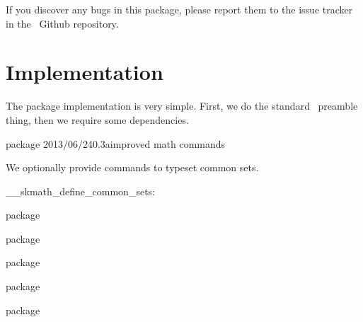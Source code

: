\documentclass[commonsets,load]{skdoc}
\begin{document}
  If you discover any bugs in this package, please report them to the issue
  tracker in the \thepackage\ Github repository.

  \Implementation\ExplHack
  \section{Implementation}
  The package implementation is very simple. First, we do the standard
  \LaTeXe\ preamble thing, then we require some dependencies.
\begin{MacroCode}{package}
\RequirePackage{expl3,l3keys2e,xparse}
    {2013/06/24}{0.3a}{improved math commands}
\RequirePackage{amssymb,mathtools,xfrac,isomath}
\end{MacroCode}

  We optionally provide commands to typeset common sets.
  \begin{macro}{\__skmath_define_common_sets:}
\begin{MacroCode}{package}
\cs_new:Nn\__skmath_define_common_sets:{
\end{MacroCode}
  \begin{macro}{\N}
\begin{MacroCode}{package}
  \NewDocumentCommand{}
\end{MacroCode}
  \end{macro}
  \begin{macro}{\Z}
\begin{MacroCode}{package}
  \NewDocumentCommand{}
\end{MacroCode}
  \end{macro}
  \begin{macro}{\Q}
\begin{MacroCode}{package}
  \NewDocumentCommand{}
\end{MacroCode}
  \end{macro}
  \begin{macro}{\R}
\begin{MacroCode}{package}
  \NewDocumentCommand{}
\end{MacroCode}
  \end{macro}
  \begin{macro}{\C}
\begin{MacroCode}{package}
  \NewDocumentCommand{}
\end{MacroCode}
  \end{macro}
\begin{MacroCode}{package}
}
\end{MacroCode}
  \end{macro}
 
\end{document}
